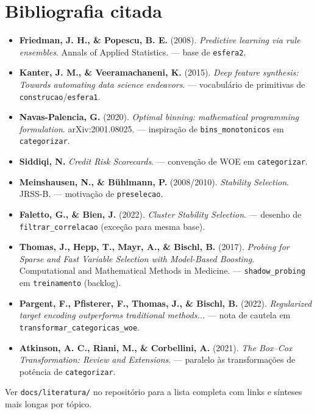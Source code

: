 \documentclass[11pt]{article}
\begin{document}
\section*{Bibliografia citada}
\begin{itemize}[leftmargin=1cm]
\item[] \label{friedman2008}\textbf{Friedman, J. H., \& Popescu, B. E.} (2008). \emph{Predictive learning via rule ensembles}. Annals of Applied Statistics. --- base de \texttt{esfera2}.
\item[] \label{kanter2015}\textbf{Kanter, J. M., \& Veeramachaneni, K.} (2015). \emph{Deep feature synthesis: Towards automating data science endeavors}. --- vocabulário de primitivas de \texttt{construcao}/\texttt{esfera1}.
\item[] \label{navaspalencia2020}\textbf{Navas-Palencia, G.} (2020). \emph{Optimal binning: mathematical programming formulation}. arXiv:2001.08025. --- inspiração de \texttt{bins\_monotonicos} em \texttt{categorizar}.
\item[] \textbf{Siddiqi, N.} \emph{Credit Risk Scorecards}. --- convenção de WOE em \texttt{categorizar}.
\item[] \label{meinshausen2010}\textbf{Meinshausen, N., \& Bühlmann, P.} (2008/2010). \emph{Stability Selection}. JRSS-B. --- motivação de \texttt{preselecao}.
\item[] \label{faletto2022}\textbf{Faletto, G., \& Bien, J.} (2022). \emph{Cluster Stability Selection}. --- desenho de \texttt{filtrar\_correlacao} (exceção para mesma base).
\item[] \label{thomas2017}\textbf{Thomas, J., Hepp, T., Mayr, A., \& Bischl, B.} (2017). \emph{Probing for Sparse and Fast Variable Selection with Model-Based Boosting}. Computational and Mathematical Methods in Medicine. --- \texttt{shadow\_probing} em \texttt{treinamento} (backlog).
\item[] \label{pargent2022}\textbf{Pargent, F., Pfisterer, F., Thomas, J., \& Bischl, B.} (2022). \emph{Regularized target encoding outperforms traditional methods...} --- nota de cautela em \texttt{transformar\_categoricas\_woe}.
\item[] \label{atkinson2021}\textbf{Atkinson, A. C., Riani, M., \& Corbellini, A.} (2021). \emph{The Box–Cox Transformation: Review and Extensions}. --- paralelo às transformações de potência de \texttt{categorizar}.
\end{itemize}

\vspace{1em}
\noindent Ver \texttt{docs/literatura/} no repositório para a lista completa
com links e sínteses mais longas por tópico.
\end{document}
